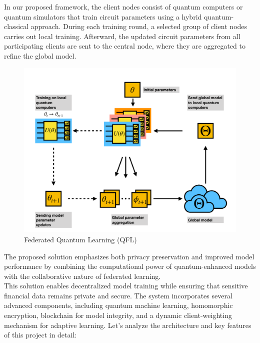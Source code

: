 \documentclass[10pt]{article}
\begin{document}
In our proposed framework, the client nodes consist of quantum computers or quantum simulators that train circuit parameters using a hybrid quantum-classical approach. During each training round, a selected group of client nodes carries out local training. Afterward, the updated circuit parameters from all participating clients are sent to the central node, where they are aggregated to refine the global model.
\begin{figure}[h!]
	\centering
	\includegraphics[height = 0.30\textheight]{img/QFL.png}
	\caption{Federated Quantum Learning (QFL)}
\end{figure}
The proposed solution emphasizes both privacy preservation and improved model performance by combining the computational power of quantum-enhanced models with the collaborative nature of federated learning.\\
This solution enables decentralized model training while ensuring that sensitive financial data remains private and secure. The system incorporates several advanced components, including quantum machine learning, homomorphic encryption, blockchain for model integrity, and a dynamic client-weighting mechanism for adaptive learning.
Let's analyze the architecture and key features of this project in detail:
\end{document}
